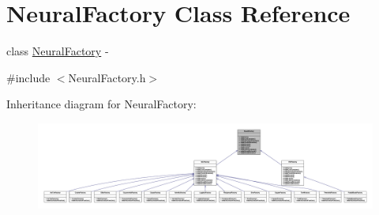 \hypertarget{class_neural_factory}{
\section{NeuralFactory Class Reference}
\label{class_neural_factory}
}


class \hyperlink{class_neural_factory}{NeuralFactory} -\/  




{\ttfamily \#include $<$NeuralFactory.h$>$}



Inheritance diagram for NeuralFactory:\nopagebreak
\begin{figure}[H]
\begin{center}
\leavevmode
\includegraphics[width=400pt]{class_neural_factory__inherit__graph}
\end{center}
\end{figure}
